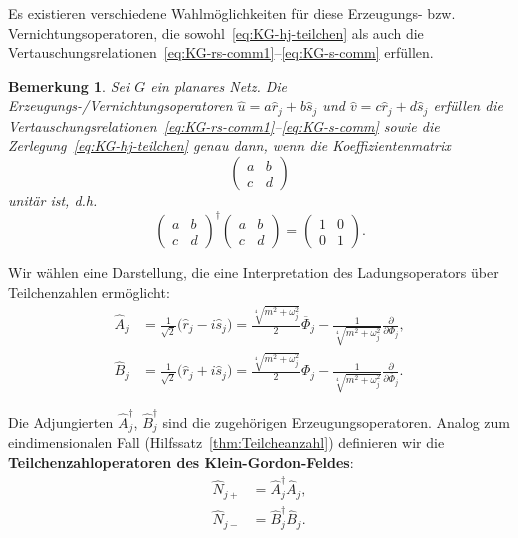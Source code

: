\documentclass[11pt,a4paper,leqno]{report}
\newtheorem{remark}[theorem]{Bemerkung}
\numberwithin{equation}{chapter}
\begin{document}
\noindent
Es existieren verschiedene Wahlmöglichkeiten für diese Erzeugungs- bzw. Vernichtungsoperatoren, die sowohl~\eqref{eq:KG-hj-teilchen} als auch die Vertauschungsrelationen~\eqref{eq:KG-rs-comm1}--\eqref{eq:KG-s-comm} erfüllen.
\begin{remark}\label{rem:KG-unitary-modes}
	Sei $G$ ein planares Netz. Die Erzeugungs-/Vernichtungsoperatoren $\hat{u} = a\hat{r}_j + b\hat{s}_j$ und $\hat{v} = c\hat{r}_j + d\hat{s}_j$ erfüllen die Vertauschungsrelationen~\eqref{eq:KG-rs-comm1}--\eqref{eq:KG-s-comm} sowie die Zerlegung~\eqref{eq:KG-hj-teilchen} genau dann, wenn die Koeffizientenmatrix
	\[
	\begin{pmatrix}
		a & b \\
		c & d
	\end{pmatrix}
	\]
	unitär ist, d.h.
	\[
	\begin{pmatrix}
		a & b \\
		c & d
	\end{pmatrix}^\dagger
	\begin{pmatrix}
		a & b \\
		c & d
	\end{pmatrix}
	=
	\begin{pmatrix}
		1 & 0 \\
		0 & 1
	\end{pmatrix}.
	\]
\end{remark}
\noindent
\noindent
Wir wählen eine Darstellung, die eine Interpretation des Ladungsoperators über Teilchenzahlen ermöglicht:
\begin{align}
	\hat{A}_j &= \frac{1}{\sqrt{2}}\bigl(\hat{r}_j - i\hat{s}_j\bigr) = \frac{\sqrt[4]{m^2 + \omega_j^2}}{2}\overline{\Phi}_j - \frac{1}{\sqrt[4]{m^2 + \omega_j^2}}\frac{\partial}{\partial\Phi_j}, \label{eq:KG-Aj} \\
	\hat{B}_j &= \frac{1}{\sqrt{2}}\bigl(\hat{r}_j + i\hat{s}_j\bigr) = \frac{\sqrt[4]{m^2 + \omega_j^2}}{2}\Phi_j - \frac{1}{\sqrt[4]{m^2 + \omega_j^2}}\frac{\partial}{\partial\overline{\Phi}_j}. \label{eq:KG-Bj}
\end{align}

\noindent
Die Adjungierten $\hat{A}_j^\dagger$, $\hat{B}_j^\dagger$ sind die zugehörigen Erzeugungsoperatoren. Analog zum eindimensionalen Fall (Hilfssatz~\ref{thm:Teilcheanzahl}) definieren wir die \textbf{Teilchenzahloperatoren des Klein-Gordon-Feldes}:
\begin{align}
	\hat{N}_{j+} &= \hat{A}_j^\dagger\hat{A}_j, \label{eq:KG-Nplus} \\
	\hat{N}_{j-} &= \hat{B}_j^\dagger\hat{B}_j. \label{eq:KG-Nminus}
\end{align}
\end{document}
